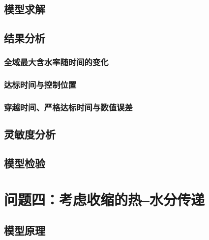 \documentclass[withoutpreface,bwprint]{cumcmthesis}
\begin{document}
\subsection{模型求解}


\subsection{结果分析}

\subsubsection{全域最大含水率随时间的变化}
\subsubsection{达标时间与控制位置}
\subsubsection{穿越时间、严格达标时间与数值误差}

\subsection{灵敏度分析}


\subsection{模型检验}


















\section{问题四：考虑收缩的热--水分传递}


\subsection{模型原理}
\end{document}
